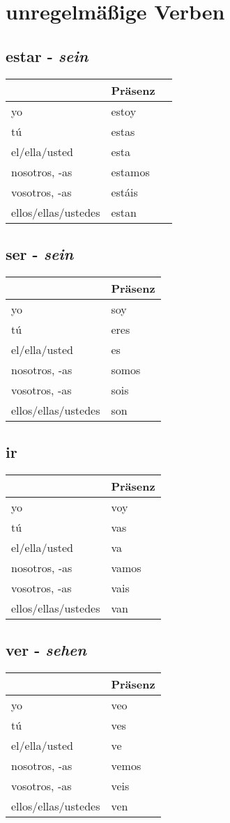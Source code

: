 \documentclass[10pt,spanish]{report}
\begin{document}
\chapter*{unregelmäßige Verben}
\section*{estar - \textit{sein}}
\begin{longtable}{p{} | p{}p{}} 
~ & \textbf{Präsenz}\\
\hline
yo & estoy\\
tú & estas\\
el/ella/usted & esta\\
nosotros, -as & estamos\\
vosotros, -as & estáis\\
ellos/ellas/ustedes & estan
\end{longtable}


\section*{ser - \textit{sein}}
\begin{longtable}{p{} | p{}} 
~ & \textbf{Präsenz}\\
\hline
yo & soy\\
tú & eres\\
el/ella/usted & es\\
nosotros, -as & somos\\
vosotros, -as & sois\\
ellos/ellas/ustedes & son
\end{longtable}

\section*{ir}
\begin{longtable}{p{} | p{}} 
~ & \textbf{Präsenz}\\
\hline
yo & voy \\
tú & vas\\
el/ella/usted & va\\
nosotros, -as & vamos \\
vosotros, -as & vais\\
ellos/ellas/ustedes & van\\
\end{longtable}


\section*{ver - \textit{sehen}}
\begin{longtable}{p{} | p{}}
~ & \textbf{Präsenz}\\
\hline
yo & veo\\
tú & ves\\
el/ella/usted & ve\\
nosotros, -as & vemos\\
vosotros, -as & veis \\
ellos/ellas/ustedes & ven
\end{longtable}
\end{document}
